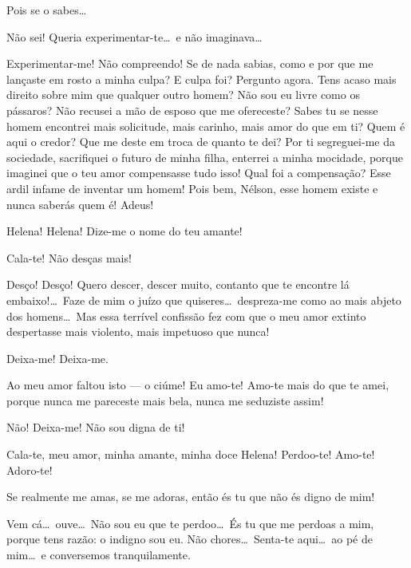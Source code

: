 {   Pois se o sabes\ldots

   Não sei! Queria
experimentar{}-te\ldots\ e não imaginava\ldots

   Experimentar{}-me! Não
compreendo! Se de nada sabias, como e por que me lançaste em rosto a
minha culpa? E culpa foi? Pergunto agora. Tens acaso mais direito sobre
mim que qualquer outro homem? Não sou eu livre como os pássaros? Não
recusei a mão de esposo que me ofereceste? Sabes tu se nesse homem
encontrei mais solicitude, mais carinho, mais amor do que em ti? Quem é
aqui o credor? Que me deste em troca de quanto te dei? Por ti
segreguei{}-me da sociedade, sacrifiquei o futuro de minha filha,
enterrei a minha mocidade, porque imaginei que o teu amor compensasse
tudo isso! Qual foi a compensação? Esse ardil infame de inventar um
homem! Pois bem, Nélson, esse homem existe e nunca saberás quem é!
Adeus!

  Helena!
Helena! Dize{}-me o nome do teu amante!

  Cala{}-te! Não desças mais!

 
Desço! Desço! Quero descer, descer muito, contanto que te
encontre lá embaixo!\ldots\ Faze de mim o juízo que quiseres\ldots\ despreza{}-me
como ao mais abjeto dos homens\ldots\ Mas essa terrível confissão fez com
que o meu amor extinto despertasse mais violento, mais impetuoso que
nunca!

  Deixa{}-me! Deixa{}-me.

  Ao meu amor faltou isto --- o ciúme! Eu amo{}-te!
Amo{}-te mais do que te amei, porque nunca me pareceste mais bela, nunca
me seduziste assim!

  Não! Deixa{}-me! Não sou digna de ti!

  Cala{}-te, meu amor, minha amante, minha doce
Helena! Perdoo{}-te! Amo{}-te! Adoro{}-te!

  Se realmente me amas, se me adoras, então és
tu que não és digno de mim! 

   Vem cá\ldots\ 
ouve\ldots\ Não sou eu que te perdoo\ldots\ És tu que me perdoas a mim, porque
tens razão: o indigno sou eu. \paren{Helena finge que chora.} Não
chores\ldots\ Senta{}-te aqui\ldots\ ao pé de mim\ldots\ e conversemos
tranquilamente. 

}
